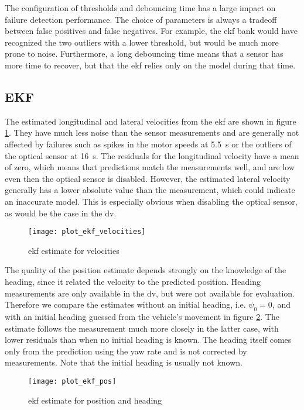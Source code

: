 The configuration of thresholds and debouncing time has a large impact on failure detection performance. The choice of parameters is always a tradeoff between false positives and false negatives. For example, the \gls{ekf} bank would have recognized the two outliers with a lower threshold, but would be much more prone to noise. Furthermore, a long debouncing time means that a sensor has more time to recover, but that the \gls{ekf} relies only on the model during that time.


\subsection{EKF}
The estimated longitudinal and lateral velocities from the \gls{ekf} are shown in figure \ref{fig:ekf-velocities}. They have much less noise than the sensor measurements and are generally not affected by failures such as spikes in the motor speeds at \SI{5.5}{\second} or the outliers of the optical sensor at \SI{16}{\second}. The residuals for the longitudinal velocity have a mean of zero, which means that predictions match the measurements well, and are low even then the optical sensor is disabled. However, the estimated lateral velocity generally has a lower absolute value than the measurement, which could indicate an inaccurate model. This is especially obvious when disabling the optical sensor, as would be the case in the \gls{dv}.

\begin{figure}[t]
	\centering
	\texttt{[image: plot\_ekf\_velocities]}%
	\caption{\gls{ekf} estimate for velocities}
	\label{fig:ekf-velocities}
\end{figure}

The quality of the position estimate depends strongly on the knowledge of the heading, since it related the velocity to the predicted position. Heading measurements are only available in the \gls{dv}, but were not available for evaluation. Therefore we compare the estimates without an initial heading, i.e. $\psi_0 = 0$, and with an initial heading guessed from the vehicle's movement in figure \ref{fig:ekf-position}. The estimate follows the measurement much more closely in the latter case, with lower residuals than when no initial heading is known. The heading itself comes only from the prediction using the yaw rate and is not corrected by measurements. Note that the initial heading is usually not known.
\begin{figure}[t]
	\centering
	\texttt{[image: plot\_ekf\_pos]}%
	\caption{\gls{ekf} estimate for position and heading}
	\label{fig:ekf-position}
\end{figure}

